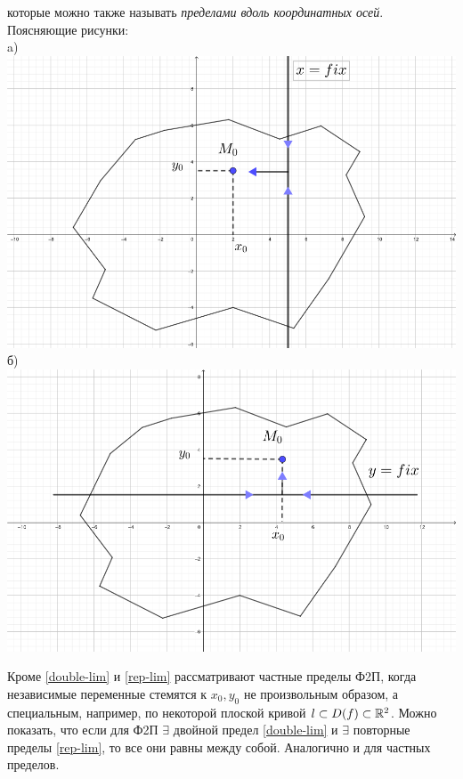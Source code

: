 \documentclass[../../main.tex]{subfiles}
\begin{document}
которые можно также называть \emph{пределами вдоль координатных осей}.
Поясняющие рисунки: \\
a) 
\includegraphics[scale=1.0]{rep-lim-case-a.png}
б) 
\includegraphics[scale=1.0]{rep-lim-case-b.png}

Кроме \eqref{double-lim} и \eqref{rep-lim} рассматривают частные
пределы Ф2П, когда независимые переменные стемятся к $x_0, y_0$
не произвольным образом, а специальным, например, по некоторой плоской
кривой $l \subset{D(f)} \subset \mathbb{R}^2$. Можно показать, что если для Ф2П
$\exists$ двойной предел \eqref{double-lim} и $\exists$ повторные
пределы \eqref{rep-lim}, то все они равны между собой. Аналогично и
для частных пределов.
\end{document}
